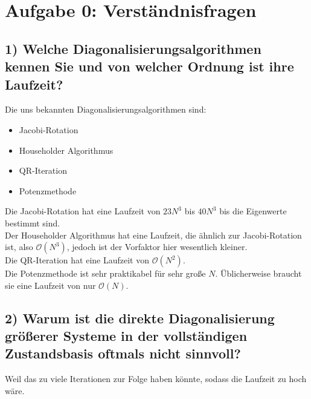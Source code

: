 \setcounter{secnumdepth}{0}
\section{Aufgabe 0: Verständnisfragen}
\label{sec:auf0}

\subsection{1) Welche Diagonalisierungsalgorithmen kennen Sie und von welcher Ordnung ist ihre Laufzeit?}
Die uns bekannten Diagonalisierungsalgorithmen sind:
\begin{itemize}
    \item Jacobi-Rotation
    \item Householder Algorithmus
    \item QR-Iteration
    \item Potenzmethode
\end{itemize}
Die Jacobi-Rotation hat eine Laufzeit von $23N^3$ bis $40N^3$ bis die Eigenwerte bestimmt sind.
\newline\\
Der Householder Algorithmus hat eine Laufzeit, die ähnlich zur Jacobi-Rotation ist, also $\mathcal{O}(N^3)$, jedoch ist der Vorfaktor hier wesentlich kleiner.
\newline\\
Die QR-Iteration hat eine Laufzeit von $\mathcal{O}(N^2)$.
\newline\\
Die Potenzmethode ist sehr praktikabel für sehr große $N$. Üblicherweise braucht sie eine Laufzeit von nur $\mathcal{O}(N)$.

\subsection{2) Warum ist die direkte Diagonalisierung größerer Systeme in der vollständigen Zustandsbasis oftmals nicht sinnvoll?}
Weil das zu viele Iterationen zur Folge haben könnte, sodass die Laufzeit zu hoch wäre.